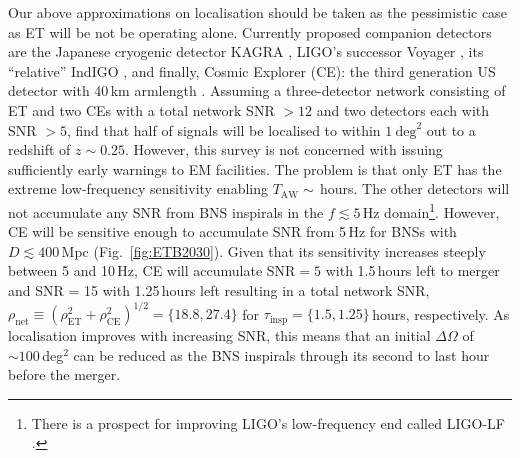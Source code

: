 \documentclass{aa}
\begin{document}

Our above approximations on localisation should be taken as the pessimistic case as 
ET will be not be operating alone. 
Currently proposed companion detectors are the Japanese cryogenic detector KAGRA \citep{Akutsu:2017thy,KAGRA2}, LIGO's successor Voyager \citep{LIGO_Voy}, its ``relative'' IndIGO \citep{Unnikrishnan:2013qwa}, 
and finally, Cosmic Explorer (CE): the third generation US detector with 40\,km armlength \citep{Evans:2016mbw}.  
Assuming a three-detector network consisting of ET and two CEs with a total network SNR $> 12$ and two detectors 
each with SNR $> 5$, \cite{Mills:2017urp} find that half of signals will be localised to within $1~\mathrm{deg}^2$
out to a redshift of $z\sim 0.25$. However, this survey is not concerned with issuing sufficiently early warnings to EM facilities. %
The problem is that only ET has the extreme low-frequency sensitivity enabling $T_\text{AW}\sim\,$hours.
The other detectors will not accumulate any SNR from BNS inspirals in the $f\lesssim 5\,$Hz domain\footnote{There is a prospect for improving LIGO's low-frequency end called LIGO-LF \citep{Yu:2017zgi}.}.
However, CE will be sensitive enough to accumulate SNR from 5\,Hz for BNSs with $D\lesssim 400\,$Mpc (Fig.~\ref{fig:ETB2030}).
Given that its sensitivity increases steeply between 5 and 10\,Hz, CE will accumulate $\text{SNR} = 5$ with 1.5\,hours left to merger and SNR = 15 with 1.25\,hours left
resulting in a total network SNR, $\rho_\text{net} \equiv (\rho_\text{ET}^2+\rho_\text{CE}^2)^{1/2}=\{18.8,27.4\}$ %
for $\tau_\text{insp}=\{1.5, 1.25\}\,$hours, respectively.
As localisation improves with increasing SNR, this means that an initial $\Delta\Omega$ of $\sim 100\,$deg$^2$
can be reduced as the BNS inspirals through its second to last hour before the merger.
\end{document}
